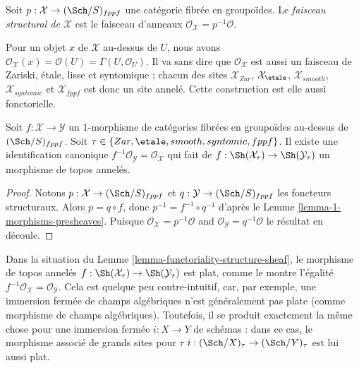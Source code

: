 \begin{definition}
\label{definition-structure-sheaf}
Soit $p : \mathcal{X} \to (\Sch/S)_{fppf}$ une catégorie
fibrée en groupoïdes. Le
{\it faisceau structural de $\mathcal{X}$} est le faisceau d'anneaux
$\mathcal{O}_\mathcal{X} = p^{-1}\mathcal{O}$.
\end{definition}

\noindent
Pour un objet $x$ de $\mathcal{X}$ au-dessus de $U$, nous avons
$\mathcal{O}_\mathcal{X}(x) = \mathcal{O}(U) = \Gamma(U, \mathcal{O}_U)$.
Il va sans dire que $\mathcal{O}_\mathcal{X}$ est aussi un faisceau de Zariski, étale,
lisse et syntomique ; chacun des sites
$\mathcal{X}_{Zar}$, $\mathcal{X}_\etale$, $\mathcal{X}_{smooth}$,
$\mathcal{X}_{syntomic}$ et $\mathcal{X}_{fppf}$ est donc un site annelé.
Cette construction est elle aussi fonctorielle.

\begin{lemma}
\label{lemma-functoriality-structure-sheaf}
Soit $f : \mathcal{X} \to \mathcal{Y}$ un $1$-morphisme de catégories
fibrées en groupoïdes au-dessus de $(\Sch/S)_{fppf}$. Soit
$\tau \in \{Zar, \etale, smooth, syntomic, fppf\}$.
Il existe une identification canonique
$f^{-1}\mathcal{O}_\mathcal{Y} = \mathcal{O}_\mathcal{X}$
qui fait de
$f : \Sh(\mathcal{X}_\tau) \to \Sh(\mathcal{Y}_\tau)$
un morphisme de topos annelés.
\end{lemma}

\begin{proof}
Notons $p : \mathcal{X} \to (\Sch/S)_{fppf}$ et
$q : \mathcal{Y} \to (\Sch/S)_{fppf}$ les foncteurs structuraux.
Alors $p = q \circ f$, donc $p^{-1} = f^{-1} \circ q^{-1}$ d'après le
Lemme \ref{lemma-1-morphisms-presheaves}. Puisque
$\mathcal{O}_\mathcal{X} = p^{-1}\mathcal{O}$ and
$\mathcal{O}_\mathcal{Y} = q^{-1}\mathcal{O}$
le résultat en découle.
\end{proof}

\begin{remark}
\label{remark-flat}
Dans la situation du
Lemme \ref{lemma-functoriality-structure-sheaf},
le morphisme de topos annelés
$f : \Sh(\mathcal{X}_\tau) \to \Sh(\mathcal{Y}_\tau)$
est plat, comme le montre l'égalité
$f^{-1}\mathcal{O}_\mathcal{X} = \mathcal{O}_\mathcal{Y}$.
Cela est quelque peu contre-intuitif, car, par exemple, une immersion
fermée de champs algébriques n'est généralement pas plate (comme morphisme de
champs algébriques).
Toutefois, il se produit exactement la même chose pour une immersion
fermée $i : X \to Y$ de schémas : dans ce cas, le morphisme associé
de grands sites pour $\tau$
$i : (\Sch/X)_\tau \to (\Sch/Y)_\tau$
est lui aussi plat.
\end{remark}




